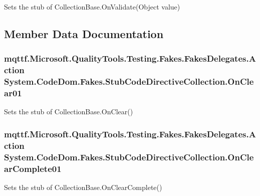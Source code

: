 Sets the stub of Collection\-Base.\-On\-Validate(\-Object value)



\subsection{Member Data Documentation}
\hypertarget{class_system_1_1_code_dom_1_1_fakes_1_1_stub_code_directive_collection_a0743dac9d3ec65067f4c9e4af9e4366c}{
\subsubsection[{On\-Clear01}]{\setlength{\rightskip}{0pt plus 5cm}mqttf.\-Microsoft.\-Quality\-Tools.\-Testing.\-Fakes.\-Fakes\-Delegates.\-Action System.\-Code\-Dom.\-Fakes.\-Stub\-Code\-Directive\-Collection.\-On\-Clear01}}\label{class_system_1_1_code_dom_1_1_fakes_1_1_stub_code_directive_collection_a0743dac9d3ec65067f4c9e4af9e4366c}


Sets the stub of Collection\-Base.\-On\-Clear()

\hypertarget{class_system_1_1_code_dom_1_1_fakes_1_1_stub_code_directive_collection_a717e9d39ca683d380427265e584697a1}{
\subsubsection[{On\-Clear\-Complete01}]{\setlength{\rightskip}{0pt plus 5cm}mqttf.\-Microsoft.\-Quality\-Tools.\-Testing.\-Fakes.\-Fakes\-Delegates.\-Action System.\-Code\-Dom.\-Fakes.\-Stub\-Code\-Directive\-Collection.\-On\-Clear\-Complete01}}\label{class_system_1_1_code_dom_1_1_fakes_1_1_stub_code_directive_collection_a717e9d39ca683d380427265e584697a1}


Sets the stub of Collection\-Base.\-On\-Clear\-Complete()


